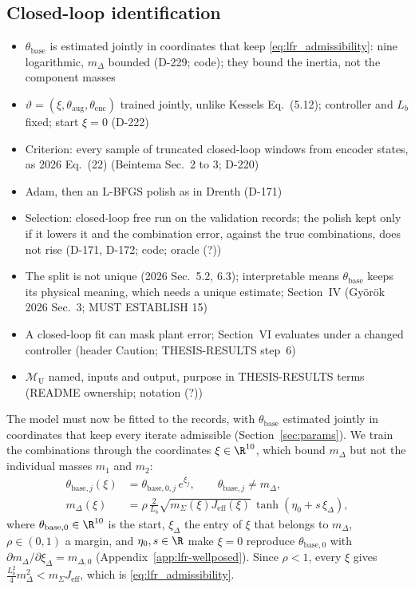 \subsection{Closed-loop identification}\label{sec:aug_closed_loop}
\ifdraft
\begin{itemize}
\item $\theta_{\mathrm{base}}$ is estimated jointly in coordinates that keep \eqref{eq:lfr_admissibility}: nine logarithmic, $m_\Delta$ bounded (D-229; code); they bound the inertia, not the component masses
\item $\vartheta=(\xi,\theta_{\mathrm{aug}},\theta_{\mathrm{enc}})$ trained jointly, unlike Kessels Eq.~(5.12); controller and $L_b$ fixed; start $\xi=0$ (D-222)
\item Criterion: every sample of truncated closed-loop windows from encoder states, as 2026 Eq.~(22) (Beintema Sec.~2 to 3; D-220)
\item Adam, then an L-BFGS polish as in Drenth (D-171)
\item Selection: closed-loop free run on the validation records; the polish kept only if it lowers it and the combination error, against the true combinations, does not rise (D-171, D-172; code; oracle (?))
\item The split is not unique (2026 Sec.~5.2, 6.3); interpretable means $\theta_{\mathrm{base}}$ keeps its physical meaning, which needs a unique estimate; Section~IV (Gy\"or\"ok 2026 Sec.~3; MUST ESTABLISH 15)
\item A closed-loop fit can mask plant error; Section~VI evaluates under a changed controller (header Caution; THESIS-RESULTS step~6)
\item $\mathcal M_{\mathrm U}$ named, inputs and output, purpose in THESIS-RESULTS terms (README ownership; notation (?))
\end{itemize}
\fi

The model must now be fitted to the records, with $\theta_{\mathrm{base}}$
estimated jointly in coordinates that keep every iterate admissible
(Section~\ref{sec:params}).
We train the combinations through the coordinates $\xi\in\R^{10}$, which
bound $m_\Delta$ but not the individual masses $m_1$ and $m_2$:
\begin{equation}
\begin{aligned}
 \theta_{\mathrm{base},j}(\xi)&=\theta_{\mathrm{base},0,j}\,e^{\xi_j},
 \qquad \theta_{\mathrm{base},j}\neq m_\Delta,\\
 m_\Delta(\xi)&=\rho\,\frac{2}{L_b}\sqrt{m_\Sigma(\xi)J_{\mathrm{eff}}(\xi)}\,
   \tanh(\eta_0+s\,\xi_\Delta),
\end{aligned}
\label{eq:mdelta_map}
\end{equation}
where $\theta_{\mathrm{base},0}\in\R^{10}$ is the start, $\xi_\Delta$ the
entry of $\xi$ that belongs to $m_\Delta$, $\rho\in(0,1)$ a margin, and
$\eta_0,s\in\R$ make $\xi=0$ reproduce $\theta_{\mathrm{base},0}$ with
$\partial m_\Delta/\partial\xi_\Delta=m_{\Delta,0}$
(Appendix~\ref{app:lfr-wellposed}).
Since $\rho<1$, every $\xi$ gives
$\tfrac{L_b^2}{4}m_\Delta^2<m_\Sigma J_{\mathrm{eff}}$, which is
\eqref{eq:lfr_admissibility}.

